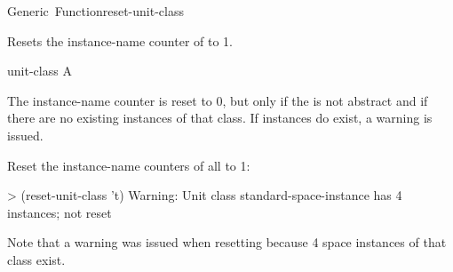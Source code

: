 \documentclass[10pt,twoside,english,pdftex]{article}
\begin{document}
\begin{functiondoc}{Generic~Function}{reset-unit-class}%
  {}

\fnsyntax

\fnpurpose Resets the  instance-name counter of
 to 1.

\fnmethods
{}%
  {\code{(} }
%
  {\code{(} }
%
  {\code{(} }

\fnpackage {}

\fnmodule {}

\fnargs
\begin{args}{unit-class}
 A 
\end{args}

\fndescription The  instance-name counter is reset to 0,
but only if the  is not abstract and if there are no
existing instances of that class.  If instances do exist, a warning is
issued.

\fnexample Reset the instance-name counters of all 
to 1:
\begin{example}
> (reset-unit-class 't)
Warning: Unit class standard-space-instance has 4 instances; not reset
\end{example}

Note that a warning was issued when resetting
\textbf{} because 4 space instances of
that class exist.

\end{functiondoc}

\end{document}
